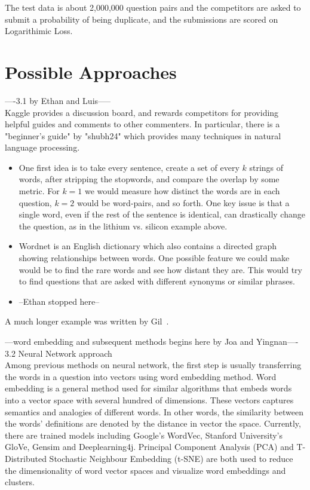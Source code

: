 \documentclass[12pt]{article}
\begin{document}
The test data is about 2,000,000 question pairs and the competitors are asked to submit a probability of being duplicate, and the submissions are scored on Logarithimic Loss.

\section{Possible Approaches}\label{approaches}
----3.1 by Ethan and Luis-----\\
Kaggle provides a discussion board, and rewards competitors for providing helpful guides and comments to other commenters. In particular, there is a "beginner's guide" by "shubh24" which provides many techniques in natural language processing.
\begin{itemize}
\item One first idea is to take every sentence, create a set of every $k$ strings of words, after stripping the stopwords, and compare the overlap by some metric. For $k=1$ we would measure how distinct the words are in each question, $k=2$ would be word-pairs, and so forth. One key issue is that a single word, even if the rest of the sentence is identical, can drastically change the question, as in the lithium vs. silicon example above.
\item Wordnet is an English dictionary which also contains a directed graph showing relationships between words. One possible feature we could make would be to find the rare words and see how distant they are. This would try to find questions that are asked with different synonyms or similar phrases.
\item --Ethan stopped here--
\end{itemize}

A much longer \LaTeXe{} example was written by Gil~\cite{Gil:02}.


---word embedding and subsequent methods begins here by Joa and Yingnan----\\

3.2 Neural Network approach \\
Among previous methods on neural network, the first step is usually transferring the words in a question into vectors using word embedding method. Word embedding is a general method used for similar algorithms that embeds words into a vector space with several hundred of dimensions. These vectors captures semantics and analogies of different words. In other words, the similarity between the words' definitions are denoted by the distance in vector the space. Currently, there are trained models including Google’s WordVec, Stanford University’s GloVe, Gensim and Deeplearning4j.  Principal Component Analysis (PCA) and T-Distributed Stochastic Neighbour Embedding (t-SNE) are both used to reduce the dimensionality of word vector spaces and visualize word embeddings and clusters.
\end{document}
